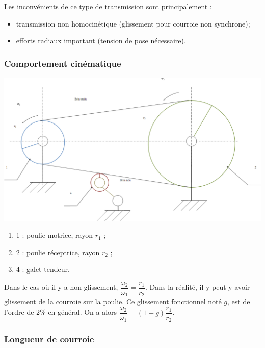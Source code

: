 \documentclass[11pt,oneside]{article}
\begin{document}
Les inconvénients de ce type de transmission sont principalement :
\begin{itemize}
\item transmission non homocinétique (glissement pour courroie non synchrone);
\item efforts radiaux important (tension de pose nécessaire).
\end{itemize}
\subsubsection{Comportement cinématique}

\begin{minipage}[c]{.55\linewidth}
\begin{center}
\includegraphics[width=.9\textwidth]{png/fig_42}
\end{center}
\end{minipage} \hfill
\begin{minipage}[c]{.4\linewidth}
\begin{enumerate}
\item 1 : poulie motrice, rayon $r_1$ ;
\item 2 : poulie réceptrice, rayon $r_2$ ;
\item 4 : galet tendeur.
\end{enumerate}
\end{minipage} 

Dans le cas où il y a non glissement,  $\dfrac{\omega_2}{\omega_1} = \dfrac{r_1}{r_2} $.
Dans la réalité, il y peut y avoir glissement de la courroie sur la poulie. Ce glissement fonctionnel noté $g$, est de l’ordre de 2\% en général. On a alors $\dfrac{\omega_2}{\omega_1}=\left(1-g\right) \dfrac{r_1}{r_2}$.

\subsubsection{Longueur de courroie}
\end{document}
